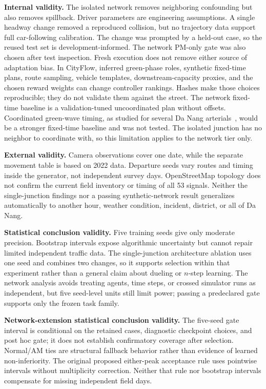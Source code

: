 \documentclass[12pt,a4paper]{report}
\begin{document}
\textbf{Internal validity.} The isolated network removes neighboring confounding but also removes spillback. Driver parameters are engineering assumptions. A single headway change removed a reproduced collision, but no trajectory data support full car-following calibration. The change was prompted by a held-out case, so the reused test set is development-informed. The network PM-only gate was also chosen after test inspection. Fresh execution does not remove either source of adaptation bias. In CityFlow, inferred green-phase roles, synthetic fixed-time plans, route sampling, vehicle templates, downstream-capacity proxies, and the chosen reward weights can change controller rankings. Hashes make those choices reproducible; they do not validate them against the street. The network fixed-time baseline is a validation-tuned uncoordinated plan without offsets. Coordinated green-wave timing, as studied for several Da Nang arterials~\cite{tran2007greenwave}, would be a stronger fixed-time baseline and was not tested. The isolated junction has no neighbor to coordinate with, so this limitation applies to the network tier only.

\textbf{External validity.} Camera observations cover one date, while the separate movement table is based on 2022 data. Departure seeds vary routes and timing inside the generator, not independent survey days. OpenStreetMap topology does not confirm the current field inventory or timing of all 53 signals. Neither the single-junction findings nor a passing synthetic-network result generalizes automatically to another hour, weather condition, incident, district, or all of Da Nang.

\textbf{Statistical conclusion validity.} Five training seeds give only moderate precision. Bootstrap intervals expose algorithmic uncertainty but cannot repair limited independent traffic data. The single-junction architecture ablation uses one seed and combines two changes, so it supports selection within that experiment rather than a general claim about dueling or $n$-step learning. The network analysis avoids treating agents, time steps, or crossed simulator runs as independent, but five seed-level units still limit power; passing a predeclared gate supports only the frozen task family.

\textbf{Network-extension statistical conclusion validity.} The five-seed gate interval is conditional on the retained cases, diagnostic checkpoint choices, and post hoc gate; it does not establish confirmatory coverage after selection. Normal/AM ties are structural fallback behavior rather than evidence of learned non-inferiority. The original proposed either-peak acceptance rule uses pointwise intervals without multiplicity correction. Neither that rule nor bootstrap intervals compensate for missing independent field days.
\end{document}
